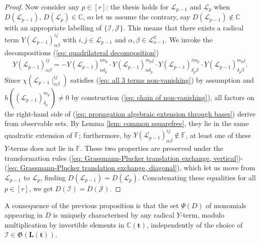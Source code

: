 \documentclass[10pt]{article}
\theoremstyle{remark}%
\theoremstyle{definition}%
\begin{document}
\begin{proof}
Now consider any $p\in[r]$: the thesis holds for $\mathcal{L}_{p-1}$ and $\mathcal{L}_{p}$ when $D(\mathcal{L}_{p-1})$, $D(\mathcal{L}_{p})\in\mathbb{C}$, so let us assume the contrary, say $D(\mathcal{L}_{p-1})\notin\mathbb{C}$ with an appropriate labelling of $\{\mathcal{I},\mathcal{J}\}$. This means that there exists a radical term $Y(\mathcal{L}_{p-1})_{\alpha\beta}^{ij}$ with $i,j\in\mathcal{L}_{p-1}$ and $\alpha,\beta\in\mathcal{L}_{o-1}^{\mathtt{C}}$. We invoke the decompositions (\ref{eq: quadrilateral decomposition}) 
\begin{equation} 
Y(\mathcal{L}_{p-1})_{\alpha\beta}^{ij} = - Y(\mathcal{L}_{p-1})_{\alpha\delta_{p}}^{im_{p}} \cdot Y(\mathcal{L}_{p-1})_{\alpha\delta_{p}}^{m_{p}j} \cdot  Y(\mathcal{L}_{p-1})_{\delta_{p}\beta}^{im_{p}} \cdot Y(\mathcal{L}_{p-1})_{\delta_{p}\beta}^{m_{p}j}. 
\label{eq: propagation algebraic extension through bases}
\end{equation} 
Since $\chi(\mathcal{L}_{p-1}\mid_{\alpha\beta}^{ij})$ satisfies (\ref{eq: all 3 terms non-vanishing}) by assumption and $h((\mathcal{L}_{p-1})_{\delta_{p}}^{m_{p}})\neq 0$ by construction (\ref{eq: chain of non-vanishing}), all factors on the right-hand side of (\ref{eq: propagation algebraic extension through bases}) derive from observable sets. By Lemma \ref{lem: common squarefree}, they lie in the same quadratic extension of $\mathbb{F}$; furthermore, by $Y(\mathcal{L}_{p-1})_{\alpha\beta}^{ij}\notin\mathbb{F}$, at least one of these $Y$-terms does not lie in $\mathbb{F}$. These two properties are preserved under the transformation rules (\ref{eq: Grassmann-Plucker translation exchange, vertical})-(\ref{eq: Grassmann-Plucker translation exchange, diagonal}), which let us move from $\mathcal{L}_{p-1}$ to $\mathcal{L}_{p}$, finding $D(\mathcal{L}_{p-1})=D(\mathcal{L}_{p})$.
Concatenating these equalities for all $p\in[r]$, we get $D(\mathcal{I})=D(\mathcal{J})$. 
\end{proof}
A consequence of the previous proposition is that the set $\Psi(D)$ of monomials appearing in $D$ is uniquely characterised by any radical $Y$-term, modulo multiplication by invertible elements in $\mathbb{C}(\mathbf{t})$, independently of the choice of $\mathcal{I}\in\mathfrak{G}(\mathbf{L}(\mathbf{t}))$. 
\end{document}
